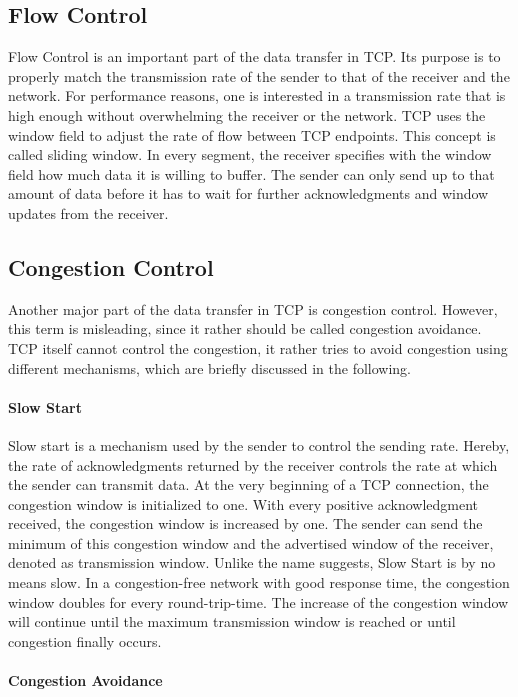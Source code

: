 \subsection*{Flow Control}

Flow Control is an important part of the data transfer in TCP. Its purpose is to properly match the transmission rate of the sender to that of the receiver and the network. For performance reasons, one is interested in a transmission rate that is high enough without overwhelming the receiver or the network. TCP uses the window field to adjust the rate of flow between TCP endpoints. This concept is called sliding window. In every segment, the receiver specifies with the window field how much data it is willing to buffer. The sender can only send up to that amount of data before it has to wait for further acknowledgments and window updates from the receiver. 

\subsection*{Congestion Control}

Another major part of the data transfer in TCP is congestion control. However, this term is misleading, since it rather should be called congestion avoidance. TCP itself cannot control the congestion, it rather tries to avoid congestion using different mechanisms, which are briefly discussed in the following. 

\paragraph{Slow Start}

Slow start is a mechanism used by the sender to control the sending rate. Hereby, the rate of acknowledgments returned by the receiver controls the rate at which the sender can transmit data. At the very beginning of a TCP connection, the congestion window is initialized to one. With every positive acknowledgment received, the congestion window is increased by one. The sender can send the minimum of this congestion window and the advertised window of the receiver, denoted as transmission window. Unlike the name suggests, Slow Start is by no means slow. In a congestion-free network with good response time, the congestion window doubles for every round-trip-time. The increase of the congestion window will continue until the maximum transmission window is reached or until congestion finally occurs.

\paragraph{Congestion Avoidance}

